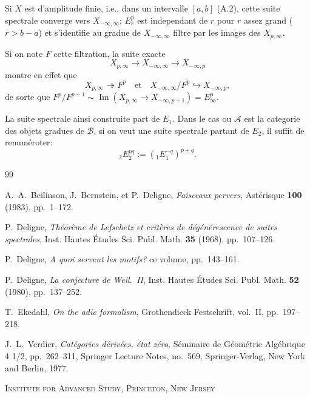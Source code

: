 \documentclass[11pt,a4paper]{article}
\theoremstyle{plain}
\theoremstyle{definition}
\newcommand{\cA}{\mathscr{A}}
\newcommand{\cB}{\mathscr{B}}
\begin{document}
Si $X$ est d'amplitude finie, i.e., dans un intervalle $[a,b]$ (A.2), cette suite spectrale converge vers $X_{-\infty,\infty}$; $E_r^p$ est independant de $r$ pour $r$ assez grand ($r > b-a$) et s'identifie au gradue de $X_{-\infty,\infty}$ filtre par les images des $X_{p,\infty}$.

Si on note $F$ cette filtration, la suite exacte
\[
X_{p,\infty} \to X_{-\infty,\infty} \to X_{-\infty,p}
\]
montre en effet que
\[
X_{p,\infty} \twoheadrightarrow F^p \quad \text{et} \quad X_{-\infty,\infty}/F^p \hookrightarrow X_{-\infty,p},
\]
de sorte que $F^p/F^{p+1} \sim \operatorname{Im}(X_{p,\infty} \to X_{-\infty,p+1}) = E_\infty^p$.

La suite spectrale ainsi construite part de $E_1$. Dans le cas ou $\cA$ est la categorie des objets gradues de $\cB$, si on veut une suite spectrale partant de $E_2$, il suffit de renum\'eroter:
\[
{}_2\!E_2^{pq} := ({}_1\!E_1^{-q})^{p+q}.
\]

\begin{thebibliography}{99}

A.~A.~Beilinson, J.~Bernstein, et P.~Deligne, \textit{Faisceaux pervers}, Ast\'erisque {\bf 100} (1983), pp.~1--172.

P.~Deligne, \textit{Th\'eor\`eme de Lefschetz et crit\`eres de d\'eg\'en\'erescence de suites spectrales}, Inst. Hautes \'Etudes Sci. Publ. Math. {\bf 35} (1968), pp.~107--126.

P.~Deligne, \textit{A quoi servent les motifs?} ce volume, pp.~143--161.

P.~Deligne, \textit{La conjecture de Weil.~II}, Inst. Hautes \'Etudes Sci. Publ. Math. {\bf 52} (1980), pp.~137--252.

T.~Ekedahl, \textit{On the adic formalism}, Grothendieck Festschrift, vol.~II, pp.~197--218.

J.~L.~Verdier, \textit{Cat\'egories d\'eriv\'ees, \'etat z\'ero}, S\'eminaire de G\'eom\'etrie Alg\'ebrique 4 1/2, pp.~262--311, Springer Lecture Notes, no.~569, Springer-Verlag, New York and Berlin, 1977.

\end{thebibliography}

\medskip
\noindent\textsc{Institute for Advanced Study, Princeton, New Jersey}
\end{document}
